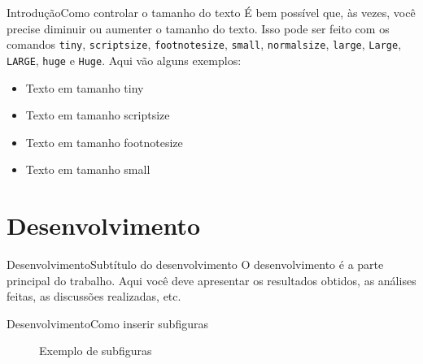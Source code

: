 \documentclass[11pt]{beamer}
\begin{document}
        \begin{frame}{Introdução}{Como controlar o tamanho do texto}
            É bem possível que, às vezes, você precise diminuir ou aumenter o 
            tamanho do texto. Isso pode ser feito com os comandos \texttt{tiny},
            \texttt{scriptsize}, \texttt{footnotesize}, \texttt{small}, \texttt{normalsize},
            \texttt{large}, \texttt{Large}, \texttt{LARGE}, \texttt{huge} e \texttt{Huge}.
            Aqui vão alguns exemplos:
            \begin{itemize}
                \item \tiny{Texto em tamanho tiny}
                \item \scriptsize{Texto em tamanho scriptsize}
                \item \footnotesize{Texto em tamanho footnotesize}
                \item \small{Texto em tamanho small}
            \end{itemize}

        \end{frame}
    
    \section{Desenvolvimento}
    
            \begin{frame}{Desenvolvimento}{Subtítulo do desenvolvimento}
                O desenvolvimento é a parte principal do trabalho. Aqui você deve
                apresentar os resultados obtidos, as análises feitas, as discussões
                realizadas, etc.
            \end{frame}

            \begin{frame}{Desenvolvimento}{Como inserir subfiguras}
                \begin{figure}
                    \centering
                    \hspace{1cm}
                    \caption{Exemplo de subfiguras}
                \end{figure}
            \end{frame}
\end{document}
